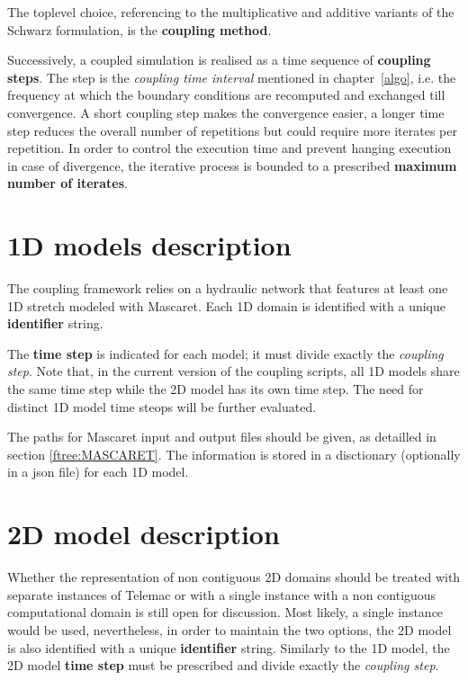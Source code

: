 The toplevel choice, referencing to the multiplicative and
additive variants of the Schwarz formulation, is the {\bf coupling
  method}.
\newline

Successively, a coupled simulation is realised
as a time sequence of {\bf coupling steps}. The step is the {\em coupling time interval}
mentioned in chapter~\ref{algo}, i.e. the frequency at which the
boundary conditions are recomputed and exchanged till convergence. A
short coupling step makes the convergence easier, a longer time step
reduces the overall number of repetitions but could require more
iterates per repetition. In order to control the execution time and
prevent hanging execution in case of divergence, the
iterative process is bounded to a prescribed {\bf maximum number of iterates}.
\newline

\section{1D models description}\label{namcon:1DMOD}
The coupling framework relies on a hydraulic network that features at least one 1D stretch modeled with
Mascaret.  Each 1D domain is identified with a unique {\bf identifier} string.
\newline

The {\bf time step} is indicated for each model; it must
divide exactly the {\em coupling step}. Note that, in the
current version of the coupling scripts, all 1D models share the same time step while the 2D model has its own time step.
The need for distinct 1D model time steops will be further evaluated.
\newline

The paths for Mascaret input and output files should be given,
as detailled in section \ref{ftree:MASCARET}. The information is stored
in a disctionary (optionally in a json file) for each
1D model.

\section{2D model description}\label{namcon:2DMOD}
Whether the representation of non contiguous 2D
domains should be treated with separate instances of Telemac
or with a single instance with a non contiguous computational
domain is still open for discussion. Most likely, a single instance would be used, nevertheless, in
order to maintain the two options, the 2D model
is also identified with a unique {\bf identifier} string.
Similarly to the 1D model, the 2D model {\bf time
  step} must be prescribed and divide exactly the {\em coupling step}.

